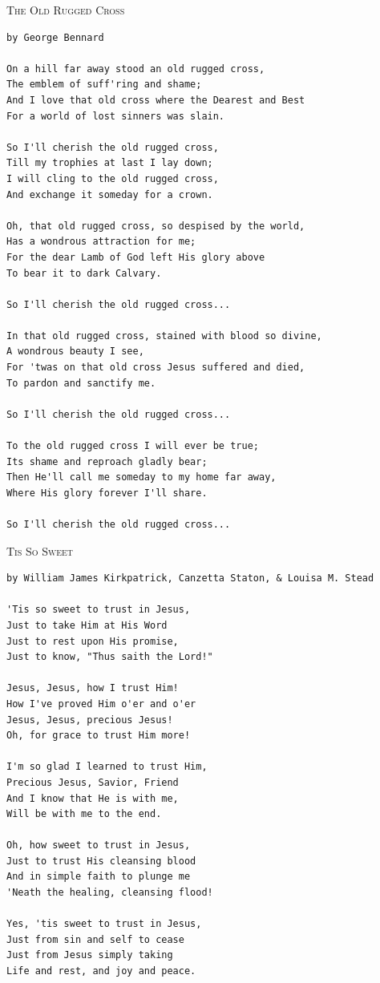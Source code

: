 \documentclass[10pt,oneside,footinclude=true,headinclude=true]{scrbook} %
\newcommand\songtitle[1]{
	\hspace*{-3.7mm}\Large\textsc{#1}
}
\begin{document}
\newpage
\songtitle{The Old Rugged Cross}
\begin{verbatim}
by George Bennard

On a hill far away stood an old rugged cross,
The emblem of suff'ring and shame;
And I love that old cross where the Dearest and Best
For a world of lost sinners was slain.

So I'll cherish the old rugged cross,
Till my trophies at last I lay down;
I will cling to the old rugged cross,
And exchange it someday for a crown.

Oh, that old rugged cross, so despised by the world,
Has a wondrous attraction for me;
For the dear Lamb of God left His glory above
To bear it to dark Calvary.

So I'll cherish the old rugged cross...

In that old rugged cross, stained with blood so divine,
A wondrous beauty I see,
For 'twas on that old cross Jesus suffered and died,
To pardon and sanctify me.

So I'll cherish the old rugged cross...

To the old rugged cross I will ever be true;
Its shame and reproach gladly bear;
Then He'll call me someday to my home far away,
Where His glory forever I'll share.

So I'll cherish the old rugged cross...
\end{verbatim}


\newpage
\songtitle{Tis So Sweet}
\begin{verbatim}
by William James Kirkpatrick, Canzetta Staton, & Louisa M. Stead

'Tis so sweet to trust in Jesus,
Just to take Him at His Word
Just to rest upon His promise,
Just to know, "Thus saith the Lord!"

Jesus, Jesus, how I trust Him!
How I've proved Him o'er and o'er
Jesus, Jesus, precious Jesus!
Oh, for grace to trust Him more!

I'm so glad I learned to trust Him,
Precious Jesus, Savior, Friend
And I know that He is with me,
Will be with me to the end.

Oh, how sweet to trust in Jesus,
Just to trust His cleansing blood
And in simple faith to plunge me
'Neath the healing, cleansing flood!

Yes, 'tis sweet to trust in Jesus,
Just from sin and self to cease
Just from Jesus simply taking
Life and rest, and joy and peace.
\end{verbatim}
\end{document}
